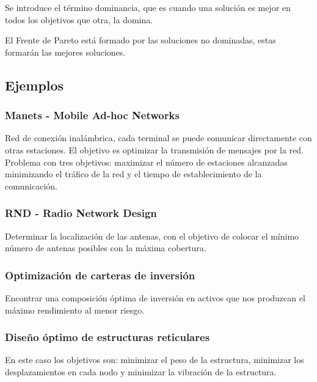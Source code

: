 \documentclass[12pt, twoside, openright]{report} %
\begin{document}
Se introduce el término dominancia, que es cuando una solución es mejor en todos los objetivos que otra, la domina.

El Frente de Pareto está formado por las soluciones no dominadas, estas formarán las mejores soluciones.

\subsection{Ejemplos}
\subsubsection{Manets - Mobile Ad-hoc Networks} 
Red de conexión inalámbrica, cada terminal se puede comunicar directamente con otras estaciones. El objetivo es optimizar la transmisión de mensajes por la red. Problema con tres objetivos: maximizar el número de estaciones alcanzadas minimizando el tráfico de la red y el tiempo de establecimiento de la comunicación.

\subsubsection{RND - Radio Network Design} 
Determinar la localización de las antenas, con el objetivo de colocar el mínimo número de antenas posibles con la máxima cobertura.

\subsubsection{Optimización de carteras de inversión} 
Encontrar una composición óptima de inversión en activos que nos produzcan el máximo rendimiento al menor riesgo.

\subsubsection{Diseño óptimo de estructuras reticulares} 
En este caso los objetivos son: minimizar el peso de la estructura, minimizar los desplazamientos en cada nodo y minimizar la vibración de la estructura.
\end{document}

